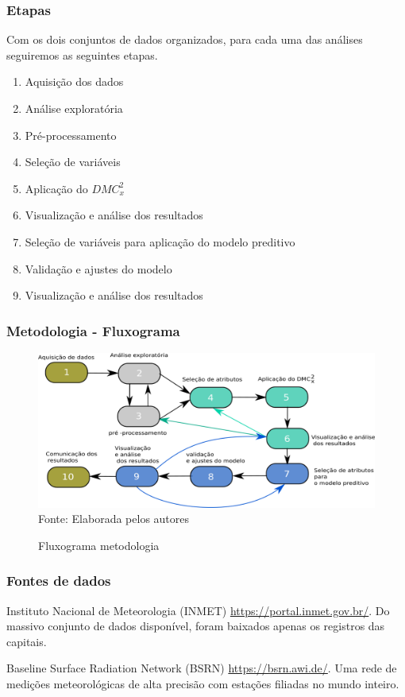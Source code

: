 \documentclass[11pt, aspectratio=169]{beamer}
\newcommand{\dmc}{\(DMC_x^2\) }
\begin{document}
\begin{frame}

  \frametitle{Etapas}
  Com os dois conjuntos de dados organizados, para cada uma das análises seguiremos as seguintes etapas.

  \begin{enumerate}
    \item Aquisição dos dados
    \item Análise exploratória
    \item Pré-processamento
    \item Seleção de variáveis
    \item Aplicação do \dmc
    \item Visualização e análise dos resultados
    \item Seleção de variáveis para aplicação do modelo preditivo
    \item Validação e ajustes do modelo
    \item Visualização e análise dos resultados
  \end{enumerate}
\end{frame}


\begin{frame}
  \frametitle{Metodologia - Fluxograma}

  \begin{figure}[!htb]
    \centering
    \caption{Fluxograma metodologia}
    \includegraphics[height=.6\paperheight]{../Figures/intro/metodo.png}
    \\{\footnotesize Fonte: Elaborada pelos autores}
    \label{fig:metodo}
  \end{figure}


\end{frame}


\begin{frame}
  \frametitle{Fontes de dados}

  Instituto Nacional de Meteorologia (INMET) \url{https://portal.inmet.gov.br/}. Do massivo conjunto de dados disponível, foram baixados apenas os registros das capitais.

  Baseline Surface Radiation Network (BSRN) \url{https://bsrn.awi.de/}. Uma rede de medições meteorológicas de alta precisão com estações filiadas no mundo inteiro.

\end{frame}
\end{document}
